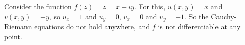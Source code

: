 \documentclass[a4paper]{scrartcl}
\begin{document}
\begin{example}
    Consider the function $f(z) = \overline{z} = x - iy$. For this, $u(x, y) = x$ and $v(x, y) = -y$, so $u_x = 1$ and $u_y = 0$, $v_x = 0$ and $v_y = -1$. So the Cauchy-Riemann equations do not hold anywhere, and $f$ is not differentiable at any point.
\end{example}


    
\end{document}
